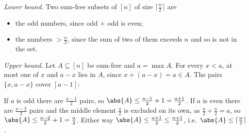 \begin{eg}[{Warm-up: \(f([n]) = \lceil \frac{n}{2} \rceil\)}]\label{eg:sum-free-interval}
    \emph{Lower bound.} Two sum-free subsets of \([n]\) of size \(\lceil \frac{n}{2} \rceil\) are
    \begin{itemize}
        \item the odd numbers, since odd \(+\) odd is even;
        \item the numbers \(> \frac{n}{2}\), since the sum of two of them exceeds \(n\) and so is not in the set.
    \end{itemize}
    \begin{center}
    \end{center}
    \emph{Upper bound.} Let \(A \subseteq [n]\) be sum-free and \(a = \max A\). For every \(x < a\), at most one of \(x\) and \(a - x\) lies in \(A\), since \(x + (a - x) = a \in A\). The pairs \(\{x, a - x\}\) cover \([a-1]\):
    \begin{center}
    \end{center}
    If \(a\) is odd there are \(\frac{a-1}{2}\) pairs, so \(\abs{A} \le \frac{a-1}{2} + 1 = \frac{a+1}{2}\). If \(a\) is even there are \(\frac{a-2}{2}\) pairs and the middle element \(\frac{a}{2}\) is excluded on its own, as \(\frac{a}{2} + \frac{a}{2} = a\), so \(\abs{A} \le \frac{a-2}{2} + 1 = \frac{a}{2}\). Either way \(\abs{A} \le \frac{a+1}{2} \le \frac{n+1}{2}\), i.e.\ \(\abs{A} \le \lceil \frac{n}{2} \rceil\).
\end{eg}


